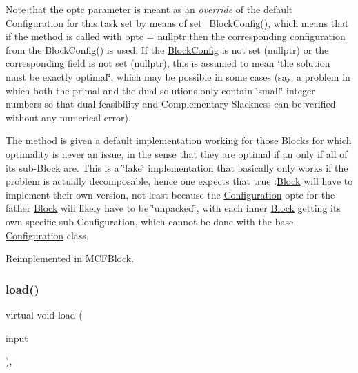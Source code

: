 Note that the optc parameter is meant as an {\itshape override} of the default \mbox{\hyperlink{class_s_m_spp__di__unipi__it_1_1_configuration}{Configuration}} for this task set by means of \mbox{\hyperlink{class_s_m_spp__di__unipi__it_1_1_block_a18d411b740a47db00d15083c5c7ef2ba}{set\+\_\+\+Block\+Config()}}, which means that if the method is called with optc = nullptr then the corresponding configuration from the Block\+Config() is used. If the \mbox{\hyperlink{class_s_m_spp__di__unipi__it_1_1_block_config}{Block\+Config}} is not set (nullptr) or the corresponding field is not set (nullptr), this is assumed to mean \char`\"{}the solution must be exactly
optimal\char`\"{}, which may be possible in some cases (say, a problem in which both the primal and the dual solutions only contain \char`\"{}small\char`\"{} integer numbers so that dual feasibility and Complementary Slackness can be verified without any numerical error).

The method is given a default implementation working for those Blocks for which optimality is never an issue, in the sense that they are optimal if an only if all of its sub-\/\+Block are. This is a \char`\"{}fake\char`\"{} implementation that basically only works if the problem is actually decomposable, hence one expects that true \+:\mbox{\hyperlink{class_s_m_spp__di__unipi__it_1_1_block}{Block}} will have to implement their own version, not least because the \mbox{\hyperlink{class_s_m_spp__di__unipi__it_1_1_configuration}{Configuration}} optc for the father \mbox{\hyperlink{class_s_m_spp__di__unipi__it_1_1_block}{Block}} will likely have to be \char`\"{}unpacked\char`\"{}, with each inner \mbox{\hyperlink{class_s_m_spp__di__unipi__it_1_1_block}{Block}} getting its own specific sub-\/\+Configuration, which cannot be done with the base \mbox{\hyperlink{class_s_m_spp__di__unipi__it_1_1_configuration}{Configuration}} class. 

Reimplemented in \mbox{\hyperlink{class_s_m_spp__di__unipi__it_1_1_m_c_f_block_a0b1e7ff87a97e692c97f52f096f6eb50}{M\+C\+F\+Block}}.

\mbox{\label{class_s_m_spp__di__unipi__it_1_1_block_a27ae9e4279482d52342c7958c34a43c6}} 
\subsubsection{\texorpdfstring{load()}{load()}}
{\footnotesize\ttfamily virtual void load (\begin{DoxyParamCaption}\item[{std\+::istream \&}]{input }\end{DoxyParamCaption})\hspace{0.3cm}{\ttfamily [protected]}, {}}



